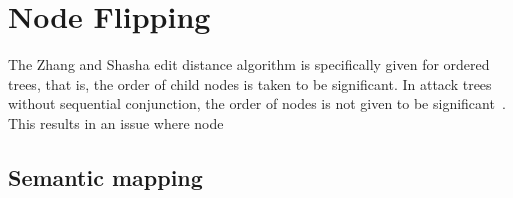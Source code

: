 \section{Node Flipping}

The Zhang and Shasha edit distance algorithm is specifically given for ordered trees, that is, the order of child nodes is taken to be significant. In attack trees without sequential conjunction, the order of nodes is not given to be significant~\cite{mauw_foundations_2006,jhawar_attack_2015}. This results in an issue where node






\subsection{Semantic mapping}



